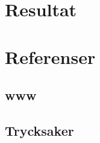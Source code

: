 \documentclass[11pt,a4paper]{article}
\begin{document}
\section{Resultat}\label{setup}

\newpage

\section{Referenser}\label{refs}

\subsection{www}\label{interwebs}

\subsection{Trycksaker}\label{literature} %


\end{document}
